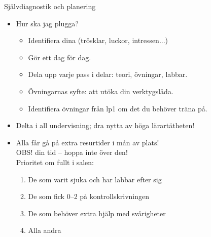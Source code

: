 %
%
%

\begin{Slide}{Självdiagnostik och planering}
\begin{itemize}
  \item Hur ska jag plugga?
  \begin{itemize}
    \item Identifiera dina  (trösklar, luckor, intressen...)
    \item Gör ett  dag för dag.
    \item Dela upp varje pass i delar: teori, övningar, labbar. 
    \item Övningarnas syfte: att utöka din verktygslåda.
    \item Identifiera övningar från lp1 om det du behöver träna på.
  \end{itemize}
  \item Delta i all undervisning; dra nytta av höga lärartätheten!
  \item Alla får gå på extra resurtider i mån av plats!\\OBS!  din  tid -- hoppa inte över den!\\Prioritet om fullt i salen:
  \begin{enumerate}
    \item De som varit sjuka och har labbar efter sig
    \item De som fick 0--2 på kontrollskrivningen
    \item De som behöver extra hjälp med svårigheter
    \item Alla andra
  \end{enumerate}
\end{itemize}
\end{Slide}

